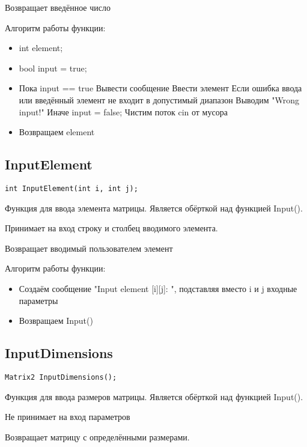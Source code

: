 Возвращает введённое число

Алгоритм работы функции:

\begin{itemize}
	\item int element;
	\item bool input = true;
	\item Пока input == true
	\subitem Вывести сообщение
	\subitem Ввести элемент
	\subitem Если ошибка ввода или введённый элемент не входит в допустимый диапазон
	\subsubitem Выводим "Wrong input!"
	\subitem Иначе
	\subsubitem input = false;
	\subitem Чистим поток cin от мусора
	\item Возвращаем element
\end{itemize}

\subsection*{InputElement}

\begin{lstlisting}[label={lst:InputElement}]
	int InputElement(int i, int j);
\end{lstlisting}

Функция для ввода элемента матрицы.
Является обёрткой над функцией Input().

Принимает на вход строку и столбец вводимого элемента.

Возвращает вводимый пользователем элемент

Алгоритм работы функции:

\begin{itemize}
	\item Создаём сообщение "Input element [i][j]: ", подставляя вместо i и j входные параметры
	\item Возвращаем Input()
\end{itemize}

\subsection*{InputDimensions}

\begin{lstlisting}[label={lst:InputDimensions}]
	Matrix2 InputDimensions();
\end{lstlisting}

Функция для ввода размеров матрицы.
Является обёрткой над функцией Input().

Не принимает на вход параметров

Возвращает матрицу с определёнными размерами.

